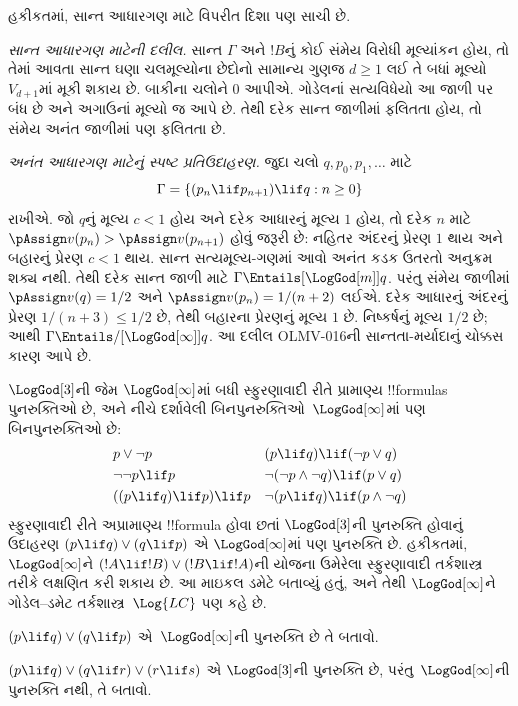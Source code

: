 \documentclass[../../../include/open-logic-section]{subfiles}
\begin{document}
હકીકતમાં, સાન્ત આધારગણ માટે વિપરીત દિશા પણ સાચી છે.

\emph{સાન્ત આધારગણ માટેની દલીલ.}
સાન્ત $\Gamma$ અને $!B$નું કોઈ સંમેય વિરોધી મૂલ્યાંકન હોય,
તો તેમાં આવતા સાન્ત ઘણા ચલમૂલ્યોના છેદોનો સામાન્ય
ગુણજ $d\ge1$ લઈ તે બધાં મૂલ્યો $V_{d+1}$માં મૂકી શકાય છે.
બાકીના ચલોને $0$ આપીએ. ગોડેલનાં સત્યવિધેયો આ જાળી પર
બંધ છે અને અગાઉનાં મૂલ્યો જ આપે છે. તેથી દરેક સાન્ત
જાળીમાં ફલિતતા હોય, તો સંમેય અનંત જાળીમાં પણ ફલિતતા છે.

\emph{અનંત આધારગણ માટેનું સ્પષ્ટ પ્રતિઉદાહરણ.}
જુદા ચલો $q,p_0,p_1,\ldots$ માટે
\[
 \Gamma=\{(p_n\lif p_{n+1})\lif q:n\ge0\}
\]
રાખીએ. જો $q$નું મૂલ્ય $c<1$ હોય અને દરેક આધારનું
મૂલ્ય $1$ હોય, તો દરેક $n$ માટે
$\pAssign v(p_n)>\pAssign v(p_{n+1})$ હોવું જરૂરી છે:
નહિતર અંદરનું પ્રેરણ $1$ થાય અને બહારનું પ્રેરણ $c<1$ થાય.
સાન્ત સત્યમૂલ્ય-ગણમાં આવો અનંત કડક ઉતરતો અનુક્રમ શક્ય નથી.
તેથી દરેક સાન્ત જાળી માટે $\Gamma\Entails[\LogGod[m]]q$.
પરંતુ સંમેય જાળીમાં
$\pAssign v(q)=1/2$ અને $\pAssign v(p_n)=1/(n+2)$ લઈએ.
દરેક આધારનું અંદરનું પ્રેરણ $1/(n+3)\le1/2$ છે, તેથી
બહારના પ્રેરણનું મૂલ્ય $1$ છે. નિષ્કર્ષનું મૂલ્ય $1/2$ છે;
આથી $\Gamma\Entails/[\LogGod[\infty]]q$.
આ દલીલ OLMV-016ની સાન્તતા-મર્યાદાનું ચોક્કસ કારણ આપે છે.

$\LogGod[3]$ની જેમ $\LogGod[\infty]$માં બધી સ્ફુરણાવાદી રીતે
પ્રામાણ્ય !!{formula}s પુનરુક્તિઓ છે, અને નીચે દર્શાવેલી
બિનપુનરુક્તિઓ~$\LogGod[\infty]$માં પણ બિનપુનરુક્તિઓ છે:
\begin{align*}
  & p \lor \lnot p && (p \lif q) \lif (\lnot p \lor q) \\
  & \lnot\lnot p \lif p && \lnot(\lnot p \land \lnot q) \lif (p \lor q) \\
  & ((p \lif q) \lif p) \lif p && \lnot(p \lif q) \lif (p \land \lnot q)
\end{align*}
સ્ફુરણાવાદી રીતે અપ્રામાણ્ય !!{formula} હોવા છતાં $\LogGod[3]$ની પુનરુક્તિ
હોવાનું ઉદાહરણ $(p \lif q) \lor (q \lif p)$ એ
$\LogGod[\infty]$માં પણ પુનરુક્તિ છે. હકીકતમાં,
$\LogGod[\infty]$ને $(!A \lif !B) \lor (!B \lif !A)$ની
યોજના ઉમેરેલા સ્ફુરણાવાદી તર્કશાસ્ત્ર તરીકે લક્ષણિત
કરી શકાય છે. આ માઇકલ ડમેટે બતાવ્યું હતું, અને તેથી
$\LogGod[\infty]$ને ગોડેલ--ડમેટ તર્કશાસ્ત્ર~$\Log{LC}$ પણ કહે છે.

\begin{prob}
  $(p \lif q) \lor (q \lif p)$ એ~$\LogGod[\infty]$ની
  પુનરુક્તિ છે તે બતાવો.
\end{prob}

\begin{prob}
  $(p \lif q) \lor (q \lif r) \lor (r \lif s)$ એ
  $\LogGod[3]$ની પુનરુક્તિ છે, પરંતુ~$\LogGod[\infty]$ની
  પુનરુક્તિ નથી, તે બતાવો.
\end{prob}
\end{document}
